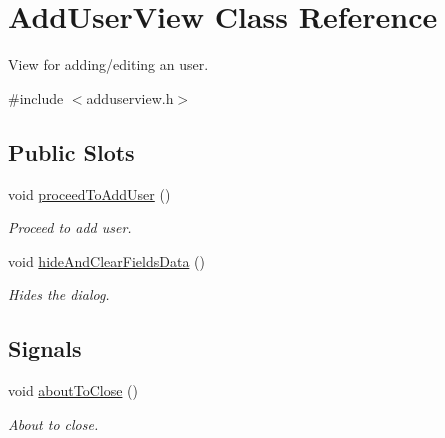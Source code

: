 \hypertarget{class_add_user_view}{\section{\-Add\-User\-View \-Class \-Reference}
\label{class_add_user_view}
}


\-View for adding/editing an user.  




{\ttfamily \#include $<$adduserview.\-h$>$}

\subsection*{\-Public \-Slots}
\begin{DoxyCompactItemize}
\item 
void \hyperlink{class_add_user_view_a3bc6d4a2fe6758919344b8221dfc5c4c}{proceed\-To\-Add\-User} ()
\begin{DoxyCompactList}\small\item\em \-Proceed to add user. \end{DoxyCompactList}\item 
void \hyperlink{class_add_user_view_a1eddd8187b0c237c0ab2df55a0671e7c}{hide\-And\-Clear\-Fields\-Data} ()
\begin{DoxyCompactList}\small\item\em \-Hides the dialog. \end{DoxyCompactList}\end{DoxyCompactItemize}
\subsection*{\-Signals}
\begin{DoxyCompactItemize}
\item 
void \hyperlink{class_add_user_view_ad8079f479466598257fbc49e93b35907}{about\-To\-Close} ()
\begin{DoxyCompactList}\small\item\em \-About to close. \end{DoxyCompactList}\end{DoxyCompactItemize}
